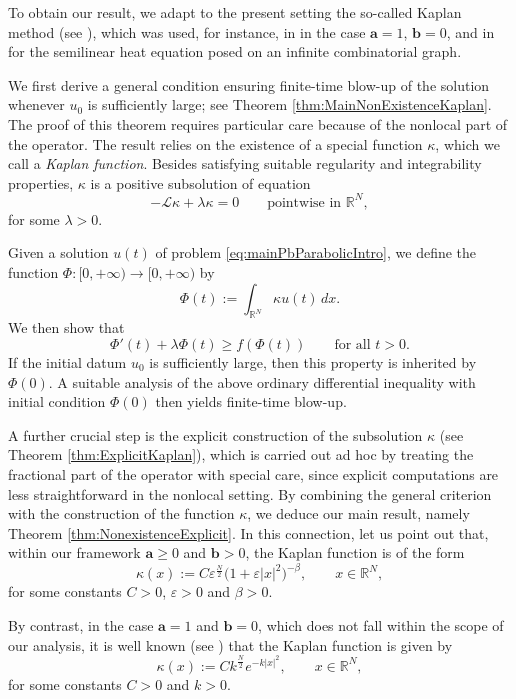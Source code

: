 \documentclass[11pt,a4paper,reqno]{amsart}
\theoremstyle{definition}
\theoremstyle{plain}
\numberwithin{equation}{section}
\begin{document}
To obtain our result, we adapt to the present setting the
so-called Kaplan method (see \cite{Kaplan}), which was used, for instance,
in \cite{BL,deP} in the case $\mathbf{a}=1$, $\mathbf{b}=0$, and in \cite{PZ1} for the
semilinear heat equation posed on an infinite combinatorial graph.

We first derive a general condition ensuring finite-time blow-up of
the solution whenever $u_0$ is sufficiently large; see
Theorem \ref{thm:MainNonExistenceKaplan}. The proof of this theorem
requires particular care because of the nonlocal part of the
operator. The result relies on the existence of a special function $\kappa$,
which we call a {\it Kaplan function}. Besides satisfying suitable
regularity and integrability properties, $\kappa$  is a positive
subsolution of equation
\[
-\mathcal L \kappa + \lambda \kappa = 0
\qquad \text{pointwise in } \mathbb{R}^N,
\]
for some $\lambda>0$.

Given a solution $u(t)$ of problem \eqref{eq:mainPbParabolicIntro}, we define the function
$\Phi \colon [0,+\infty)\to[0,+\infty)$ by
\[
\Phi(t):=\int_{\mathbb{R}^N}\kappa u(t)\,dx.
\]
We then show that
\[
\Phi'(t)+\lambda\Phi(t)\ge f(\Phi(t))
\qquad \text{for all } t>0.
\]
If the initial datum $u_0$ is sufficiently large, then this property
is inherited by $\Phi(0)$. A suitable analysis of the above ordinary
differential inequality with initial condition $\Phi(0)$ then yields finite-time blow-up.

A further crucial step is the explicit construction of the
subsolution $\kappa$ (see Theorem \ref{thm:ExplicitKaplan}), which is carried out ad hoc by treating the
fractional part of the operator with special care, since explicit
computations are less straightforward in the nonlocal setting. By combining the general criterion with the construction of the
function $\kappa$, we deduce our main result, namely
Theorem \ref{thm:NonexistenceExplicit}. In this connection, let us point out that, within our framework
$\mathbf{a}\geq 0$ and $\mathbf{b}>0$, the Kaplan function is of the form
\[
\kappa(x):=C\varepsilon^{\frac N2}
\bigl(1+\varepsilon |x|^2\bigr)^{-\beta},
\qquad x\in\mathbb R^N,
\]
for some constants $C>0$, $\varepsilon>0$ and $\beta>0$.

By contrast, in the case $\mathbf{a}=1$ and $\mathbf{b}=0$,
which does not fall within the scope of our analysis, it is well known
(see \cite{BL,deP}) that the Kaplan function is given by
\[
\kappa(x):=Ck^{\frac N2}e^{-k|x|^2},
\qquad x\in\mathbb R^N,
\]
for some constants $C>0$ and $k>0$.
\end{document}
